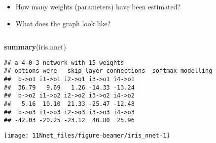 \documentclass[10pt,ignorenonframetext,]{beamer}
\newenvironment{Shaded}{\begin{snugshade}}{\end{snugshade}}
\newcommand{\KeywordTok}[1]{\textcolor[rgb]{0.13,0.29,0.53}{\textbf{#1}}}
\newcommand{\NormalTok}[1]{#1}
\begin{document}
\begin{frame}[fragile]

\begin{itemize}
\item
  How many weights (parameters) have been estimated?
\item
  What does the graph look like?
\end{itemize}

\(~\)

\scriptsize

\begin{Shaded}
\begin{Highlighting}[]
\KeywordTok{summary}\NormalTok{(iris.nnet)}
\end{Highlighting}
\end{Shaded}

\begin{verbatim}
## a 4-0-3 network with 15 weights
## options were - skip-layer connections  softmax modelling 
##  b->o1 i1->o1 i2->o1 i3->o1 i4->o1 
##  36.79   9.69   1.26 -14.33 -13.24 
##  b->o2 i1->o2 i2->o2 i3->o2 i4->o2 
##   5.16  10.10  21.33 -25.47 -12.48 
##  b->o3 i1->o3 i2->o3 i3->o3 i4->o3 
## -42.03 -20.25 -23.12  40.80  25.96
\end{verbatim}

\end{frame}

\begin{frame}

\begin{center}\texttt{[image: 11Nnet\_files/figure-beamer/iris\_nnet-1]} \end{center}

\end{frame}
\end{document}
